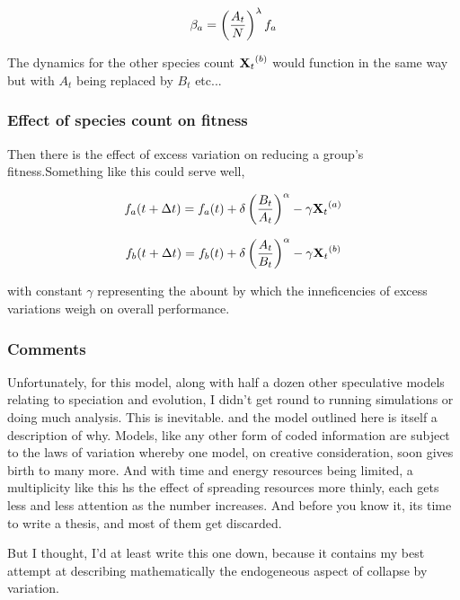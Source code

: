 $$\beta_a = \left(\frac{A_t}{N}\right)^\lambda f_a$$ 

\noindent
The dynamics for the other species count ${{\bf X}_t}^{(b)}$ would function in the same way but with $A_t$ being replaced by $B_t$ etc... 

\subsubsection*{Effect of species count on fitness}

\noindent
Then there is the effect of excess variation on reducing a group's fitness.Something like this could serve well,

$$f_a(t+\Delta t) = f_a(t) + \delta \left(\frac{B_t}{A_t}\right)^\alpha  - \gamma {{\bf X}_t}^{(a)}$$

$$f_b(t+\Delta t) = f_b(t) + \delta \left(\frac{A_t}{B_t}\right)^\alpha  - \gamma {{\bf X}_t}^{(b)}$$

\noindent
with constant $\gamma$ representing the abount by which the inneficencies of excess variations weigh on overall performance. \par 

\subsubsection*{Comments}
Unfortunately, for this model, along with half a dozen other speculative models relating to speciation and evolution, I didn't get round to running simulations or doing much analysis. This is inevitable. and the model outlined here is itself a description of why. Models, like any other form of coded information are subject to the laws of variation whereby one model, on creative consideration, soon gives birth to many more. And with time and energy resources being limited, a multiplicity like this hs the effect of spreading resources more thinly, each gets less and less attention as the number increases. And before you know it, its time to write a thesis, and most of them get discarded.\par
But I thought, I'd at least write this one down, because it contains my best attempt at describing mathematically the endogeneous aspect of collapse by variation.
